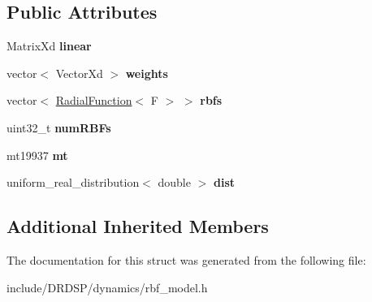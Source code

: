 \subsection*{Public Attributes}
\begin{DoxyCompactItemize}
\item 
\hypertarget{struct_d_r_d_s_p_1_1_r_b_f_model_ac51e09cfe2835c579311b1e6af4d6bd5}{Matrix\-Xd {\bfseries linear}}\label{struct_d_r_d_s_p_1_1_r_b_f_model_ac51e09cfe2835c579311b1e6af4d6bd5}

\item 
\hypertarget{struct_d_r_d_s_p_1_1_r_b_f_model_addf12092388aa72254703b66b105fdb0}{vector$<$ Vector\-Xd $>$ {\bfseries weights}}\label{struct_d_r_d_s_p_1_1_r_b_f_model_addf12092388aa72254703b66b105fdb0}

\item 
\hypertarget{struct_d_r_d_s_p_1_1_r_b_f_model_ae2be6ec17e38407cebd5dc9e14306042}{vector$<$ \hyperlink{struct_d_r_d_s_p_1_1_radial_function}{Radial\-Function}$<$ F $>$ $>$ {\bfseries rbfs}}\label{struct_d_r_d_s_p_1_1_r_b_f_model_ae2be6ec17e38407cebd5dc9e14306042}

\item 
\hypertarget{struct_d_r_d_s_p_1_1_r_b_f_model_a17e081f45e92ad97f70a3bcee445fa96}{uint32\-\_\-t {\bfseries num\-R\-B\-Fs}}\label{struct_d_r_d_s_p_1_1_r_b_f_model_a17e081f45e92ad97f70a3bcee445fa96}

\item 
\hypertarget{struct_d_r_d_s_p_1_1_r_b_f_model_ad59bbfc3c81ab7edf5ca3be326d82068}{mt19937 {\bfseries mt}}\label{struct_d_r_d_s_p_1_1_r_b_f_model_ad59bbfc3c81ab7edf5ca3be326d82068}

\item 
\hypertarget{struct_d_r_d_s_p_1_1_r_b_f_model_a44536df3bd7cd674006c25c49ee17ec6}{uniform\-\_\-real\-\_\-distribution$<$ double $>$ {\bfseries dist}}\label{struct_d_r_d_s_p_1_1_r_b_f_model_a44536df3bd7cd674006c25c49ee17ec6}

\end{DoxyCompactItemize}
\subsection*{Additional Inherited Members}


The documentation for this struct was generated from the following file\-:\begin{DoxyCompactItemize}
\item 
include/\-D\-R\-D\-S\-P/dynamics/rbf\-\_\-model.\-h\end{DoxyCompactItemize}
